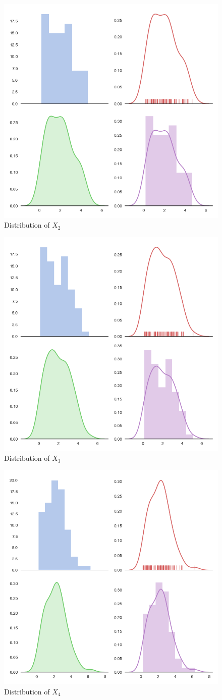 \documentclass[10pt,journal]{IEEEtran}
\begin{document}
\\
\begin{figure}[!ht]
	\centering
	\includegraphics[width=0.7\columnwidth,height=0.6\linewidth]{10_2.png}
	\caption{Distribution of \(X_2\)}
\end{figure}
\begin{figure}[!ht]
	\centering
	\includegraphics[width=0.7\columnwidth,height=0.6\linewidth]{10_3.png}
	\caption{Distribution of \(X_3\)}
\end{figure}
\begin{figure}[!ht]
\centering
\includegraphics[width=0.7\columnwidth,height=0.6\linewidth]{10_4.png}
\caption{Distribution of \(X_4\)}
\end{figure}
\end{document}
